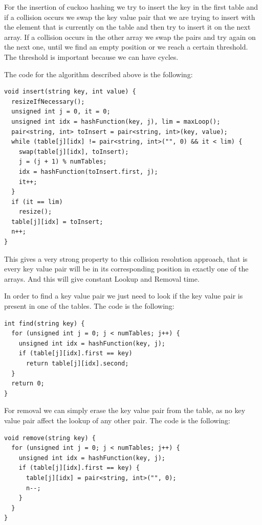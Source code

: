 
For the insertion of cuckoo hashing we try to insert the key in the first table and if a collision occurs we swap the key value pair that we are trying to insert with the element that is currently on the table and then try to insert it on the next array. If a collision occurs in the other array we swap the pairs and try again on the next one, until we find an empty position or we reach a certain threshold. The threshold is important because we can have cycles.


The code for the algorithm described above is the following:

\begin{lstlisting}
void insert(string key, int value) {
  resizeIfNecessary();
  unsigned int j = 0, it = 0;
  unsigned int idx = hashFunction(key, j), lim = maxLoop();
  pair<string, int> toInsert = pair<string, int>(key, value);
  while (table[j][idx] != pair<string, int>("", 0) && it < lim) {
    swap(table[j][idx], toInsert);
    j = (j + 1) % numTables;
    idx = hashFunction(toInsert.first, j);
    it++;
  }
  if (it == lim)
    resize();
  table[j][idx] = toInsert;
  n++;
}
\end{lstlisting}

This gives a very strong property to this collision resolution approach, that is every key value pair will be in its corresponding position in exactly one of the arrays. And this will give constant Lookup and Removal time. 

In order to find a key value pair we just need to look if the key value pair is present in one of the tables. The code is the following:

\begin{lstlisting}
int find(string key) {
  for (unsigned int j = 0; j < numTables; j++) {
    unsigned int idx = hashFunction(key, j);
    if (table[j][idx].first == key)
      return table[j][idx].second;
  }
  return 0;
}
\end{lstlisting}

For removal we can simply erase the key value pair from the table, as no key value pair affect the lookup of any other pair. The code is the following:

\begin{lstlisting}
void remove(string key) {
  for (unsigned int j = 0; j < numTables; j++) {
    unsigned int idx = hashFunction(key, j);
    if (table[j][idx].first == key) {
      table[j][idx] = pair<string, int>("", 0);
      n--;
    }
  }
}
\end{lstlisting}

